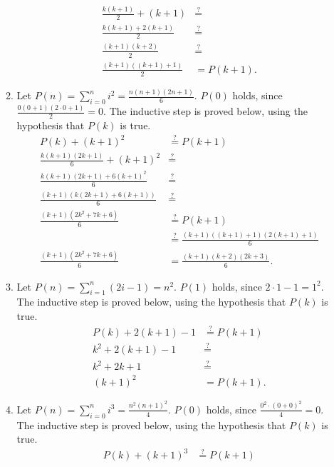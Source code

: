 \documentclass[12pt]{article}
\begin{document}
\begin{enumerate}
\begin{enumerate}
\begin{align*}
            \frac{k (k + 1)}{2} + (k + 1) &\stackrel{?}{=} \\
            \frac{k (k + 1) + 2(k + 1)}{2} &\stackrel{?}{=} \\
            \frac{(k + 1)(k + 2)}{2} &\stackrel{?}{=} \\
            \frac{(k + 1)((k + 1) + 1)}{2} &= P(k + 1).
        \end{align*}
        \item Let $P(n) = \sum_{i = 0}^{n} i^{2} = \frac{n (n + 1) (2n + 1)}{6}$. $P(0)$ holds, since $\frac{0 (0 + 1) (2 \cdot 0 + 1)}{2} = 0$. The inductive step is proved below, using the hypothesis that $P(k)$ is true.
        \begin{align*}
            P(k) + (k + 1)^{2} &\stackrel{?}{=} P(k + 1) \\
            \frac{k (k + 1) (2k + 1)}{6} + (k + 1)^{2} &\stackrel{?}{=} \\
            \frac{k (k + 1) (2k + 1) + 6(k + 1)^{2}}{6} &\stackrel{?}{=} \\
            \frac{(k + 1)(k(2k + 1) + 6(k + 1))}{6} &\stackrel{?}{=} \\
            \frac{(k + 1)(2k^2 + 7k + 6)}{6} &\stackrel{?}{=} P(k + 1) \\
            &\stackrel{?}{=} \frac{(k + 1)((k + 1) + 1)(2(k + 1) + 1)}{6} \\
            \frac{(k + 1)(2k^2 + 7k + 6)}{6} &= \frac{(k + 1)(k + 2)(2k + 3)}{6}.
        \end{align*}
        \item Let $P(n) = \sum_{i = 1}^{n} (2i - 1) = n^{2}$. $P(1)$ holds, since $2 \cdot 1 - 1 = 1^{2}$. The inductive step is proved below, using the hypothesis that $P(k)$ is true.
        \begin{align*}
            P(k) + 2(k + 1) - 1 &\stackrel{?}{=} P(k + 1) \\
            k^{2} + 2(k + 1) - 1 &\stackrel{?}{=} \\
            k^{2} + 2k + 1 &\stackrel{?}{=} \\
            (k + 1)^{2} &= P(k + 1).
        \end{align*}
        \item Let $P(n) = \sum_{i = 0}^{n} i^{3} = \frac{n^{2} (n + 1)^{2}}{4}$. $P(0)$ holds, since $\frac{0^{2} \cdot (0 + 0)^{2}}{4} = 0$. The inductive step is proved below, using the hypothesis that $P(k)$ is true.
        \begin{align*}
            P(k) + (k + 1)^{3} &\stackrel{?}{=} P(k + 1) \\

\end{align*}
\end{enumerate}
\end{enumerate}
\end{document}

